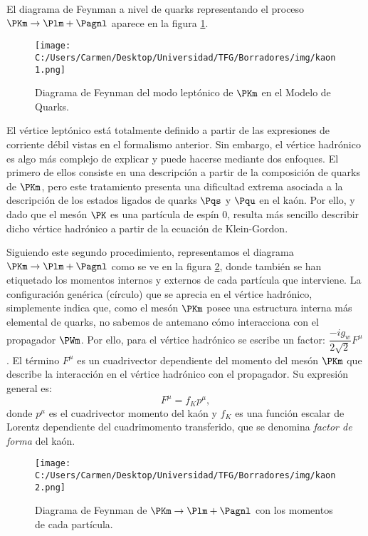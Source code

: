 El diagrama de Feynman a nivel de quarks representando el proceso $\PKm \rightarrow \Plm + \Pagnl$ aparece en la figura \ref{fig:diagrama1}.

\begin{figure}[ht!]
	\centering
	\texttt{[image: C:/Users/Carmen/Desktop/Universidad/TFG/Borradores/img/kaon1.png]}
	\caption[Diagrama de Feynman de quarks de $\PKm \rightarrow \Plm + \Pagnl$]
	{Diagrama de Feynman del modo leptónico de $\PKm$ en el Modelo de Quarks.}
	\label{fig:diagrama1}
\end{figure}

El vértice leptónico está totalmente definido a partir de las expresiones de corriente débil vistas en el formalismo anterior. Sin embargo, el vértice hadrónico es algo más complejo de explicar y puede hacerse mediante dos enfoques. El primero de ellos consiste en una descripción a partir de la composición de quarks de $\PKm$, pero este tratamiento presenta una dificultad extrema asociada a la descripción de los estados ligados de quarks $\Pqs$ y $\Pqu$ en el kaón. Por ello, y dado que el mesón $\PK$ es una partícula de espín 0, resulta más sencillo describir dicho vértice hadrónico a partir de la ecuación de Klein-Gordon.

Siguiendo este segundo procedimiento, representamos el diagrama $\PKm \rightarrow \Plm + \Pagnl$ como se ve en la figura \ref{fig:diagrama2}, donde también se han etiquetado los momentos internos y externos de cada partícula que interviene. La configuración genérica (círculo) que se aprecia en el vértice hadrónico, simplemente indica que, como el mesón $\PKm$ posee una estructura interna más elemental de quarks, no sabemos de antemano cómo interacciona con el propagador $\PWm$. Por ello, para el vértice hadrónico se escribe un factor: $\dfrac{-ig_{w}}{2\sqrt{2}}F^{\mu}$. El término $F^{\mu}$ es un cuadrivector dependiente del momento del mesón $\PKm$ que describe la interacción en el vértice hadrónico con el propagador. Su expresión general es:
\begin{equation}
F^{\mu}=f_{K}p^{\mu} ,\label{eq:formfactor}
\end{equation}
donde $p^{\mu}$ es el cuadrivector momento del kaón y  $f_{K}$ es una función escalar de Lorentz dependiente del cuadrimomento transferido, que se denomina \textit{factor de forma} del kaón. 

\begin{figure}[ht!]
	\centering
	\texttt{[image: C:/Users/Carmen/Desktop/Universidad/TFG/Borradores/img/kaon2.png]}
	\caption[Diagrama de Feynman de $\PKm \rightarrow \Plm + \Pagnl$ con los momentos]
	{Diagrama de Feynman de $\PKm \rightarrow \Plm + \Pagnl$ con los momentos de cada partícula.}
	\label{fig:diagrama2}
\end{figure}

